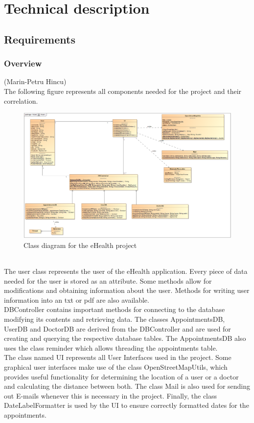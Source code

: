 \documentclass[a4paper, 12pt]{report}
\begin{document}


\chapter{Technical description}
\section{Requirements}
\subsection{Overview}
{\tiny (Marin-Petru Hincu)\\}
The following figure represents all components needed for the project and their correlation.
\begin{figure}[!h]
\includegraphics[width=\linewidth]{clImg.png} 
\caption{Class diagram for the eHealth project}
\end{figure}
\\The user class represents the user of the eHealth application. Every piece of data needed for the user is stored as an attribute. Some methods allow for modifications and obtaining information about the user. Methods for writing user information into an txt or pdf are also available. \\
DBController contains important methods for connecting to the database modifying its contents and retrieving data. The classes AppointmentsDB, UserDB and DoctorDB are derived from the DBController and are used for creating and querying the respective database tables. The AppointmentsDB also uses the class reminder which allows threading the appointments table.\\The class named UI represents all User Interfaces used in the project. Some graphical user interfaces make use of the class OpenStreetMapUtils, which provides useful functionality for determining the location of a user or a doctor and calculating the distance between both. The class Mail is also used for sending out E-mails whenever this is necessary in the project. Finally, the class DateLabelFormatter is used by the UI to ensure correctly formatted dates for the appointments. \\
\end{document}
